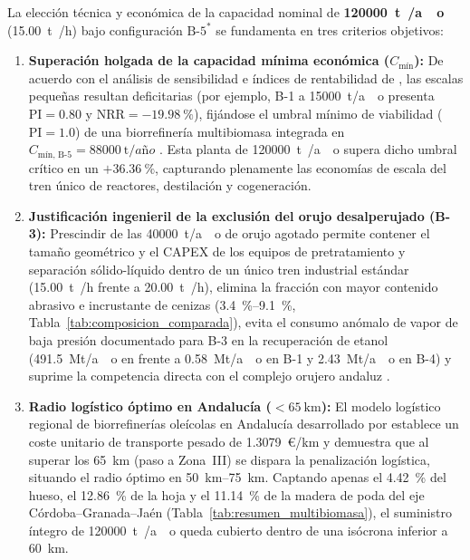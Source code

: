 \documentclass{report}
\begin{document}
La elección técnica y económica de la capacidad nominal de \textbf{\SI{120000}{\tonne{}/ao}} (\SI{15.00}{\tonne{}/\hour}) bajo configuración $\text{B-5}^*$ se fundamenta en tres criterios objetivos:
\begin{enumerate}
    \item \textbf{Superación holgada de la capacidad mínima económica ($C_{\text{mín}}$):} De acuerdo con el análisis de sensibilidad e índices de rentabilidad de \textcite[Tablas~12 y~13]{Jafari-Gohargan2026}, las escalas pequeñas resultan deficitarias (por ejemplo, B-1 a \SI{15000}{t/ao} presenta $\text{PI} = \num{0.80}$ y $\text{NRR} = -\SI{19.98}{\percent}$), fijándose el umbral mínimo de viabilidad ($\text{PI} = 1.0$) de una biorrefinería multibiomasa integrada en \textbf{$C_{\text{mín, B-5}} = \SI{88000}{\tonne/a\text{\~{n}}o}$} \autocite[Tabla~13]{Jafari-Gohargan2026}. Esta planta de \SI{120000}{\tonne{}/ao} supera dicho umbral crítico en un \textbf{$+\SI{36.36}{\percent}$}, capturando plenamente las economías de escala del tren único de reactores, destilación y cogeneración.
    \item \textbf{Justificación ingenieril de la exclusión del orujo desalperujado (B-3):} Prescindir de las \SI{40000}{\tonne/ao} de orujo agotado permite contener el tamaño geométrico y el CAPEX de los equipos de pretratamiento y separación sólido-líquido dentro de un único tren industrial estándar (\SI{15.00}{\tonne{}/\hour} frente a \SI{20.00}{\tonne{}/\hour}), elimina la fracción con mayor contenido abrasivo e incrustante de cenizas (\SI{3.4}{\percent}--\SI{9.1}{\percent}, Tabla~\ref{tab:composicion_comparada}), evita el consumo anómalo de vapor de baja presión documentado para B-3 en la recuperación de etanol (\SI{491.5}{\mega\tonne/ao} en \textcite[Tabla~8]{Jafari-Gohargan2026} frente a \SI{0.58}{\mega\tonne/ao} en B-1 y \SI{2.43}{\mega\tonne/ao} en B-4) y suprime la competencia directa con el complejo orujero andaluz \autocite[Sección~4.2.3]{APPA2026}.
    \item \textbf{Radio logístico óptimo en Andalucía ($< \SI{65}{\kilo\meter}$):} El modelo logístico regional de biorrefinerías oleícolas en Andalucía desarrollado por \textcite[Sección~2.5, Sección~3.4, Tabla~3 y Fig.~11]{Ronda2027} establece un coste unitario de transporte pesado de \num{1.3079}~€/km y demuestra que al superar los \SI{65}{\kilo\meter} (paso a Zona~III) se dispara la penalización logística, situando el radio óptimo en \SI{50}{\kilo\meter}--\SI{75}{\kilo\meter}. Captando apenas el \SI{4.42}{\percent} del hueso, el \SI{12.86}{\percent} de la hoja y el \SI{11.14}{\percent} de la madera de poda del eje Córdoba--Granada--Jaén (Tabla~\ref{tab:resumen_multibiomasa}), el suministro íntegro de \SI{120000}{\tonne{}/ao} queda cubierto dentro de una isócrona inferior a \SI{60}{\kilo\meter}.
\end{enumerate}
\end{document}
